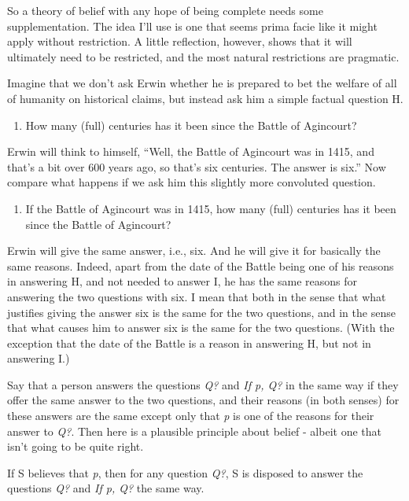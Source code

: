 \documentclass[
  10pt,
  letterpaper,
  twoside]{scrbook}
\providecommand{\tightlist}{%
  \setlength{\itemsep}{0pt}\setlength{\parskip}{0pt}}\usepackage{longtable,booktabs,array}
\begin{document}
So a theory of belief with any hope of being complete needs some
supplementation. The idea I'll use is one that seems prima facie like it
might apply without restriction. A little reflection, however, shows
that it will ultimately need to be restricted, and the most natural
restrictions are pragmatic.

Imagine that we don't ask Erwin whether he is prepared to bet the
welfare of all of humanity on historical claims, but instead ask him a
simple factual question H.

\begin{enumerate}
\def\labelenumi{\Alph{enumi}.}
\setcounter{enumi}{7}
\tightlist
\item
  How many (full) centuries has it been since the Battle of Agincourt?
\end{enumerate}

Erwin will think to himself, ``Well, the Battle of Agincourt was in
1415, and that's a bit over 600 years ago, so that's six centuries. The
answer is six.'' Now compare what happens if we ask him this slightly
more convoluted question.

\begin{enumerate}
\def\labelenumi{\Roman{enumi}.}
\tightlist
\item
  If the Battle of Agincourt was in 1415, how many (full) centuries has
  it been since the Battle of Agincourt?
\end{enumerate}

Erwin will give the same answer, i.e., six. And he will give it for
basically the same reasons. Indeed, apart from the date of the Battle
being one of his reasons in answering H, and not needed to answer I, he
has the same reasons for answering the two questions with six. I mean
that both in the sense that what justifies giving the answer six is the
same for the two questions, and in the sense that what causes him to
answer six is the same for the two questions. (With the exception that
the date of the Battle is a reason in answering H, but not in answering
I.)

Say that a person answers the questions \emph{Q?} and \emph{If p, Q?} in
the same way if they offer the same answer to the two questions, and
their reasons (in both senses) for these answers are the same except
only that \emph{p} is one of the reasons for their answer to \emph{Q?}.
Then here is a plausible principle about belief - albeit one that isn't
going to be quite right.

\begin{description}
\tightlist
\item[Unrestricted Conditional Questions]
If S believes that \emph{p}, then for any question \emph{Q?}, S is
disposed to answer the questions \emph{Q?} and \emph{If p, Q?} the same
way.
\end{description}
\end{document}
